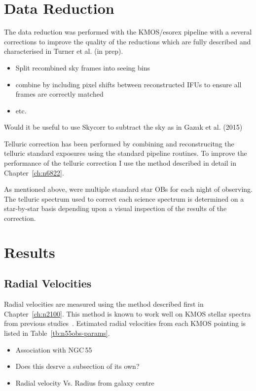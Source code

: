 \section{Data Reduction} %
\label{sec:data_reduction}

The data reduction was performed with the KMOS/esorex pipeline with a several corrections to improve the quality of the reductions which are fully described and characterised in Turner et al. (in prep).

\begin{itemize}
    \item Split recombined sky frames into seeing bins
    \item combine by including pixel shifts between reconstructed IFUs to ensure all frames are correctly matched
    \item etc.
\end{itemize}

Would it be useful to use Skycorr to subtract the sky as in Gazak et al. (2015)

Telluric correction has been performed by combining and reconstrucitng the telluric standard exposures using the standard pipeline routines.
To improve the performance of the telluric correction I use the method described in detail in Chapter~\ref{ch:n6822}.

As mentioned above, were multiple standard star OBs for each night of observing.
The telluric spectrum used to correct each science spectrum is determined on a star-by-star basis depending upon a visual inspection of the results of the correction.


\section{Results} %
\label{sec:results}

\subsection{Radial Velocities} %
\label{sub:rvs}
Radial velocities are measured using the method described first in Chapter~\ref{ch:n2100}.
This method is known to work well on KMOS stellar spectra from previous studies~\cite{2015ApJ...798...23L,2015ApJ...803...14P,2016arXiv160202702P}.
Estimated radial velocities from each KMOS pointing is listed in Table~\ref{tb:n55obs-params}.


\begin{itemize}
    \item Association with NGC\,55
    \item Does this desrve a subsection of its own?
    \item Radial velocity Vs. Radius from galaxy centre
\end{itemize}

